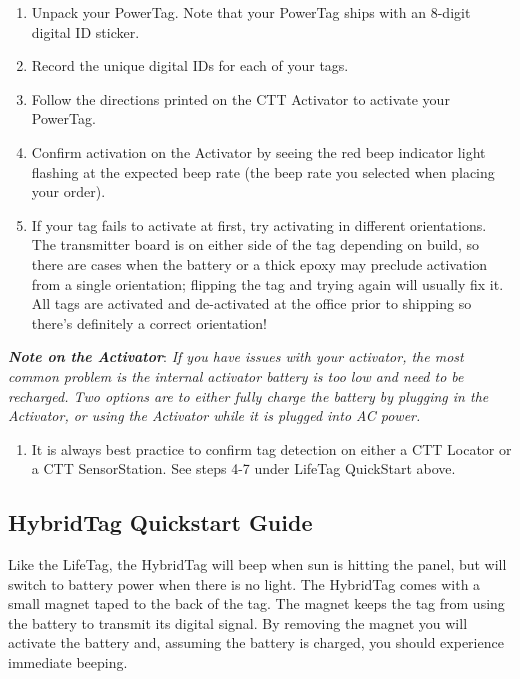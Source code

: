 \documentclass[
]{article}
\providecommand{\tightlist}{%
  \setlength{\itemsep}{0pt}\setlength{\parskip}{0pt}}
\begin{document}
\begin{enumerate}
\def\labelenumi{\arabic{enumi}.}
\item
  Unpack your PowerTag. Note that your PowerTag ships with an 8-digit
  digital ID sticker.
\item
  Record the unique digital IDs for each of your tags.
\item
  Follow the directions printed on the CTT Activator to activate your
  PowerTag.
\item
  Confirm activation on the Activator by seeing the red beep indicator
  light flashing at the expected beep rate (the beep rate you selected
  when placing your order).
\item
  If your tag fails to activate at first, try activating in different
  orientations. The transmitter board is on either side of the tag
  depending on build, so there are cases when the battery or a thick
  epoxy may preclude activation from a single orientation; flipping the
  tag and trying again will usually fix it. All tags are activated and
  de-activated at the office prior to shipping so there's definitely a
  correct orientation!
\end{enumerate}

\textbf{\emph{Note on the Activator}}: \emph{If you have issues with
your activator, the most common problem is the internal activator
battery is too low and need to be recharged. Two options are to either
fully charge the battery by plugging in the Activator, or using the
Activator while it is plugged into AC power.}

\begin{enumerate}
\def\labelenumi{\arabic{enumi}.}
\setcounter{enumi}{5}
\tightlist
\item
  It is always best practice to confirm tag detection on either a CTT
  Locator or a CTT SensorStation. See steps 4-7 under LifeTag QuickStart
  above.
\end{enumerate}

\hypertarget{hybridtag-quickstart-guide}{%
\subsection{HybridTag Quickstart
Guide}\label{hybridtag-quickstart-guide}}

Like the LifeTag, the HybridTag will beep when sun is hitting the panel,
but will switch to battery power when there is no light. The HybridTag
comes with a small magnet taped to the back of the tag. The magnet keeps
the tag from using the battery to transmit its digital signal. By
removing the magnet you will activate the battery and, assuming the
battery is charged, you should experience immediate beeping.
\end{document}
